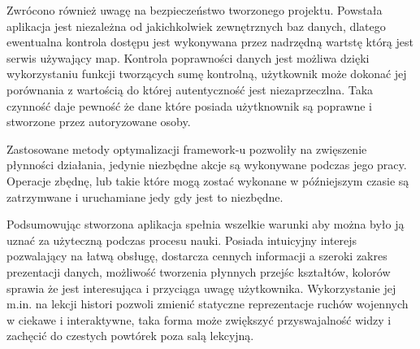 Zwrócono również uwagę na bezpieczeństwo tworzonego projektu. Powstała aplikacja jest niezależna od jakichkolwiek zewnętrznych baz danych, dlatego ewentualna kontrola dostępu jest wykonywana przez nadrzędną wartstę którą jest serwis używający map. Kontrola poprawności danych jest możliwa dzięki wykorzystaniu funkcji tworzących sumę kontrolną, użytkownik może dokonać jej porównania z wartością do której autentyczność jest niezaprzeczlna. Taka czynność daje pewność że dane które posiada użytknownik są poprawne i stworzone przez autoryzowane osoby.

Zastosowane metody optymalizacji framework-u pozwoliły na zwięszenie płynności działania, jedynie niezbędne akcje są wykonywane podczas jego pracy. Operacje zbędnę, lub takie które mogą zostać wykonane w późniejszym czasie są zatrzymwane i uruchamiane jedy gdy jest to niezbędne.
 
Podsumowując stworzona aplikacja spełnia wszelkie warunki aby można było ją uznać za użyteczną podczas procesu nauki. Posiada intuicyjny interejs pozwalający na łatwą obsługę, dostarcza cennych informacji a szeroki zakres prezentacji danych, możliwość tworzenia płynnych przejśc kształtów, kolorów sprawia że jest interesująca i przyciąga uwagę użytkownika. Wykorzystanie jej m.in. na lekcji histori pozwoli zmienić statyczne reprezentacje ruchów wojennych w ciekawe i interaktywne, taka forma może zwiększyć przyswajalność widzy i zachęcić do czestych powtórek poza salą lekcyjną.

